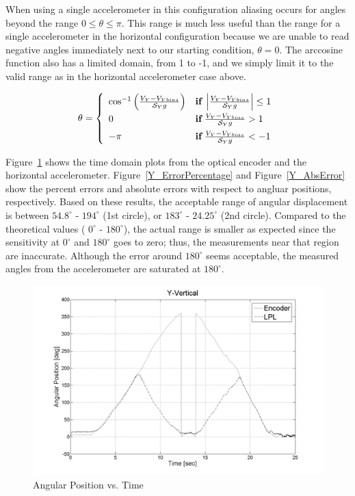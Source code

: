 \documentclass{article}
\theoremstyle{plain}
\theoremstyle{definition}
\theoremstyle{remark}
\newcommand{\Sens}{\mathcal{S}}
\begin{document}
When using a single accelerometer in this configuration aliasing occurs for angles beyond the range $0 \leq \theta \leq \pi$.  This range is much less useful than the range for a single accelerometer in the horizontal configuration because we are unable to read negative angles immediately next to our starting condition, $\theta = 0$.  The arccosine function also has a limited domain, from 1 to -1, and we simply limit it to the valid range as in the horizontal accelerometer case above.

$$\theta = \left\{ 
	\begin{array}{l l}
		\cos^{-1}\left( \frac{V_{Y} - V_{Ybias}}{\Sens_{Y} g}\right) & {\bf{if }} \, \left| \frac{V_{Y} - V_{Ybias}}{\Sens_{Y} g} \right| \leq 1 \\[6pt]
		0 & {\bf{if }} \, \frac{V_{Y} - V_{Ybias}}{\Sens_{Y} g} > 1 \\[6pt]
		-\pi & {\bf{if} } \, \frac{V_{Y} - V_{Ybias}}{\Sens_{Y} g} < -1
	\end{array} \right. $$


Figure~\ref{Y_TimeDomain} shows the time domain plots from the optical encoder and the horizontal accelerometer. Figure~\ref{Y_ErrorPercentage} and Figure~\ref{Y_AbsError} show the percent errors and absolute errors with respect to angluar positions, respectively. Based on these results, the acceptable range of angular displacement is between $54.8^\circ$ - $194^\circ$ (1st circle), or $183^\circ$ - $24.25^\circ$ (2nd circle). Compared to the theoretical values ( $0^\circ$ - $180^\circ$), the actual range is smaller as expected since the sensitivity at $0^\circ$ and $180^\circ$ goes to zero; thus, the measurements near that region are inaccurate. Although the error around $180^\circ$ seems acceptable, the measured angles from the accelerometer are saturated at $180^\circ$. \\

\begin{figure}[hbt]
\begin{center}
\includegraphics[width = 12cm]{Y_TimeDomain.png}
\caption{Angular Position vs. Time}
\label{Y_TimeDomain}
\end{center}
\end{figure}
\end{document}
